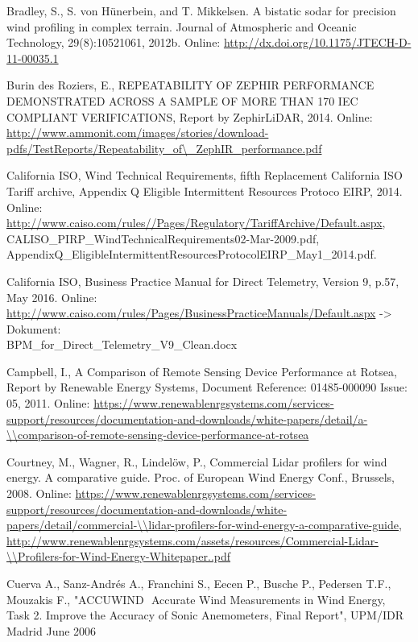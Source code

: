 Bradley, S., S. von Hünerbein, and T. Mikkelsen. A bistatic sodar for precision wind profiling in complex terrain. Journal of Atmospheric and Oceanic Technology, 29(8):1052­1061, 2012b. Online: \small{\url{http://dx.doi.org/10.1175/JTECH-D-11-00035.1}}

Burin des Roziers, E., REPEATABILITY OF ZEPHIR PERFORMANCE DEMONSTRATED ACROSS A SAMPLE OF MORE THAN 170 IEC COMPLIANT VERIFICATIONS, Report by ZephirLiDAR, 2014.  Online: \small{\url{http://www.ammonit.com/images/stories/download-pdfs/TestReports/Repeatability_of\\_ZephIR_performance.pdf}}

California ISO, Wind Technical Requirements, fifth Replacement California ISO Tariff archive, Appendix Q Eligible Intermittent Resources Protoco EIRP, 2014.             
Online: \small{\url{http://www.caiso.com/rules//Pages/Regulatory/TariffArchive/Default.aspx}}, CALISO\_PIRP\_WindTechnicalRequirements02-Mar-2009.pdf, AppendixQ\_EligibleIntermittentResourcesProtocolEIRP\_May1\_2014.pdf.


California ISO,  Business Practice Manual for Direct Telemetry, Version 9, p.57, May 2016. 
Online: \small{\url{http://www.caiso.com/rules/Pages/BusinessPracticeManuals/Default.aspx}} -> Dokument: \\BPM\_for\_Direct\_Telemetry\_V9\_Clean.docx

Campbell, I., A Comparison of Remote Sensing Device Performance at Rotsea, Report by Renewable Energy Systems, Document Reference: 01485-000090 Issue: 05, 2011.
Online: \url{https://www.renewablenrgsystems.com/services-support/resources/documentation-and-downloads/white-papers/detail/a-\\comparison-of-remote-sensing-device-performance-at-rotsea}
	
Courtney, M., Wagner, R., Lindelöw, P., Commercial Lidar profilers for wind energy. A comparative guide. Proc. of European Wind Energy Conf., Brussels, 2008.
Online: \url{https://www.renewablenrgsystems.com/services-support/resources/documentation-and-downloads/white-papers/detail/commercial-\\lidar-profilers-for-wind-energy-a-comparative-guide},
{\small\url{http://www.renewablenrgsystems.com/assets/resources/Commercial-Lidar-\\Profilers-for-Wind-Energy-Whitepaper..pdf}}


Cuerva A., Sanz-Andrés A., Franchini S., Eecen P., Busche P., Pedersen T.F., Mouzakis F., "ACCUWIND ­ Accurate Wind Measurements in Wind Energy, Task 2. Improve the Accuracy of Sonic Anemometers, Final Report", UPM/IDR Madrid June 2006


